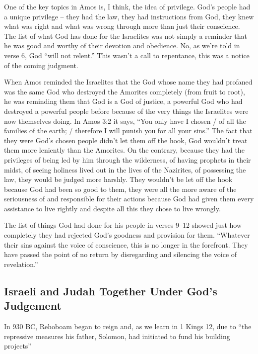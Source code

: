 One of the key topics in Amos is, I think, the idea of privilege. God's people
had a unique privilege -- they had the law, they had instructions from God, they
knew what was right and what was wrong through more than just their conscience.
The list of what God has done for the Israelites was not simply a reminder that
he was good and worthy of their devotion and obedience. No, as we're told in
verse 6, God \enquote{will not relent.} This wasn't a call to repentance, this
was a notice of the coming judgment.

When Amos reminded the Israelites that the God whose name they had profaned was
the same God who destroyed the Amorites completely (from fruit to root), he was
reminding them that God is a God of justice, a powerful God who had destroyed a
powerful people before because of the very things the Israelites were now
themselves doing. In Amos 3:2 it says, \enquote{You only have I chosen / of all
the families of the earth; / therefore I will punish you for all your sins.} The
fact that they were God's chosen people didn't let them off the hook, God
wouldn't treat them more leniently than the Amorites. On the contrary, because
they had the privileges of being led by him through the wilderness, of having
prophets in their midst, of seeing holiness lived out in the lives of the
Nazirites, of possessing the law, they would be judged more harshly. They
wouldn't be let off the hook because God had been so good to them, they were all
the more aware of the seriousness of and responsible for their actions because
God had given them every assistance to live rightly and despite all this they
chose to live wrongly.

The list of things God had done for his people in verses 9--12 showed just how
completely they had rejected God's goodness and provision for them.
\enquote{Whatever their sins against the voice of conscience, this is no longer
in the forefront. They have passed the point of no return by disregarding and
silencing the voice of revelation.}
\autocite[109]{smith:2017}

\subsection{Israeli and Judah Together Under God's Judgement}

In 930 BC, Rehoboam began to reign and, as we learn in 1 Kings 12, due to
\enquote{the repressive measures his father, Solomon, had initiated to fund his
building projects}\autocite[22]{rusten:2005}

